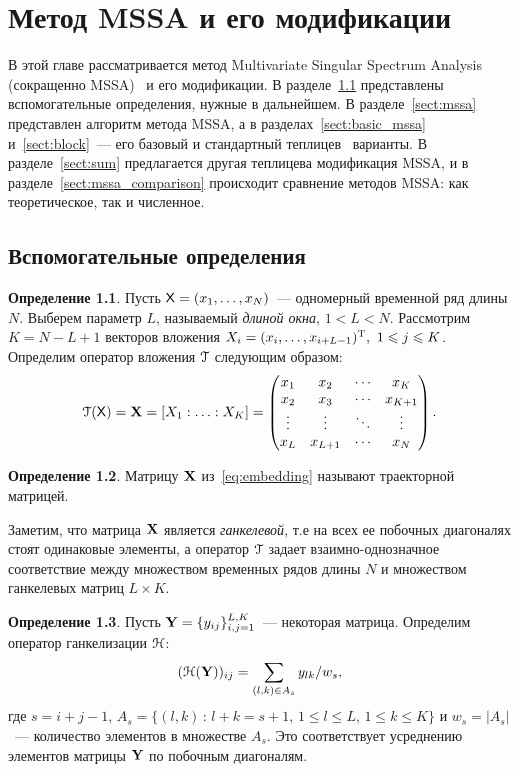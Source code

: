 \documentclass[specialist,
substylefile = spbu_report.rtx,
subf,href,colorlinks=true, 12pt]{disser}
\theoremstyle{definition}
\newtheorem{definition}{Определение}
\begin{document}
\chapter{Метод MSSA и его модификации}\label{chpt:mssa}
В этой главе рассматривается метод Multivariate Singular Spectrum Analysis (сокращенно MSSA)~\cite{Golyandina2015} и его модификации. В разделе~\ref{sect:definitions} представлены вспомогательные определения, нужные в дальнейшем. В разделе~\ref{sect:mssa} представлен алгоритм метода MSSA, а в разделах~\ref{sect:basic_mssa} и~\ref{sect:block}~--- его базовый и стандартный теплицев~\cite{Plaut1994} варианты. В разделе~\ref{sect:sum} предлагается другая теплицева модификация MSSA, и в разделе~\ref{sect:mssa_comparison} происходит сравнение методов MSSA: как теоретическое, так и численное.

\section{Вспомогательные определения}\label{sect:definitions}
\begin{definition}
	Пусть $\mathsf{X}=(x_1,\ldots,x_N)$~--- одномерный временной ряд длины $N$. Выберем параметр $L$, называемый \emph{длиной окна}, $1<L<N$. Рассмотрим $K=N-L+1$ векторов вложения $X_i=(x_{i},\ldots, x_{i+L-1})^{\mathrm{T}},\ 1\leqslant j \leqslant K$. Определим оператор вложения $\EuScript{T}$ следующим образом:
	\begin{equation}\label{eq:embedding}
		\EuScript{T}(\mathsf{X})=\mathbf{X}=[X_1:\ldots:X_K]=
		\begin{pmatrix}
			x_1    & x_2     & \cdots & x_K     \\
			x_2    & x_3     & \cdots & x_{K+1} \\
			\vdots & \vdots  & \ddots & \vdots  \\
			x_L    & x_{L+1} & \cdots & x_N
		\end{pmatrix}.
	\end{equation}
\end{definition}
\begin{definition}
	Матрицу $\mathbf{X}$ из~\eqref{eq:embedding} называют траекторной матрицей.
\end{definition}\noindent
Заметим, что матрица $\mathbf{X}$ является \emph{ганкелевой}, т.е на всех ее побочных диагоналях стоят одинаковые элементы, а оператор $\EuScript{T}$ задает взаимно-однозначное соответствие между множеством временных рядов длины $N$ и множеством ганкелевых матриц $L\times K$.
\begin{definition}
	Пусть $\mathbf{Y}=\{y_{ij}\}_{i,j=1}^{L,K}$~--- некоторая матрица. Определим оператор ганкелизации $\EuScript{H}$:
	\begin{equation}\label{eq:averaging}
		(\EuScript{H}(\mathbf{Y}))_{ij}=\sum_{(l,k)\in A_s}y_{lk}/w_s,
	\end{equation}
	где $s=i+j-1$, $A_s=\{(l,k)\, :\, l+k=s+1,\, 1\leqslant l\leqslant L,\, 1\leqslant k\leqslant K\}$ и $w_s=|A_s|$~--- количество элементов в множестве $A_s$. Это соответствует
	усреднению элементов матрицы $\mathbf{Y}$ по побочным диагоналям.
\end{definition}
\end{document}
